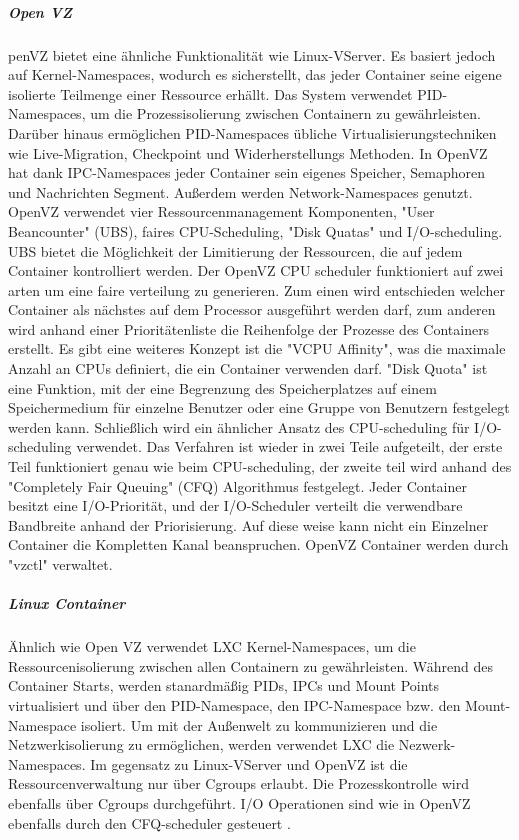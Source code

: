 \subparagraph{Open VZ}
penVZ bietet eine ähnliche Funktionalität wie Linux-VServer. Es basiert jedoch auf Kernel-Namespaces, wodurch es sicherstellt, das jeder Container seine eigene isolierte Teilmenge einer Ressource erhällt. Das System verwendet PID-Namespaces, um die Prozessisolierung zwischen Containern zu gewährleisten. Darüber hinaus ermöglichen PID-Namespaces übliche Virtualisierungstechniken wie Live-Migration, Checkpoint und Widerherstellungs Methoden. In OpenVZ hat dank IPC-Namespaces jeder Container sein eigenes Speicher, Semaphoren und Nachrichten Segment. Außerdem werden Network-Namespaces genutzt. OpenVZ verwendet vier Ressourcenmanagement Komponenten, "User Beancounter" (UBS), faires CPU-Scheduling, "Disk Quatas" und I/O-scheduling. UBS bietet die Möglichkeit der Limitierung der Ressourcen, die auf jedem Container kontrolliert werden. Der OpenVZ CPU scheduler funktioniert auf zwei arten um eine faire verteilung zu generieren. Zum einen wird entschieden welcher Container als nächstes auf dem Processor ausgeführt werden darf, zum anderen wird anhand einer Prioritätenliste die Reihenfolge der Prozesse des Containers erstellt. Es gibt eine weiteres Konzept ist die "VCPU Affinity", was die maximale Anzahl an CPUs definiert, die ein Container verwenden darf. "Disk Quota" ist eine Funktion, mit der eine Begrenzung des Speicherplatzes auf einem Speichermedium für einzelne Benutzer oder eine Gruppe von Benutzern festgelegt werden kann. Schließlich wird ein ähnlicher Ansatz des CPU-scheduling für I/O-scheduling verwendet. Das Verfahren ist wieder in zwei Teile aufgeteilt, der erste Teil funktioniert genau wie beim CPU-scheduling, der zweite teil wird anhand des "Completely Fair Queuing" (CFQ) Algorithmus festgelegt. Jeder Container besitzt eine I/O-Priorität, und der I/O-Scheduler verteilt die verwendbare Bandbreite anhand der Priorisierung. Auf diese weise kann nicht ein Einzelner Container die Kompletten Kanal beanspruchen. OpenVZ Container werden durch "vzctl"\cite{ParallelsIPHoldingsGMbH2018Vzctl} verwaltet\cite{IndexOpenvz.org}\cite{Xavier2015AClouds}.

\subparagraph{Linux Container}
Ähnlich wie Open VZ verwendet LXC Kernel-Namespaces, um die Ressourcenisolierung zwischen allen Containern zu gewährleisten. Während des Container Starts, werden stanardmäßig PIDs, IPCs und Mount Points virtualisiert und über den PID-Namespace, den IPC-Namespace bzw. den Mount-Namespace isoliert. Um mit der Außenwelt zu kommunizieren und die Netzwerkisolierung zu ermöglichen, werden verwendet LXC die Nezwerk-Namespaces. Im gegensatz zu Linux-VServer und OpenVZ ist die Ressourcenverwaltung nur über Cgroups erlaubt. Die Prozesskontrolle wird ebenfalls über Cgroups durchgeführt. I/O Operationen sind wie in OpenVZ ebenfalls durch den CFQ-scheduler gesteuert \cite{IndexLinuxcontainers.Org} \cite{Xavier2015AClouds}.

